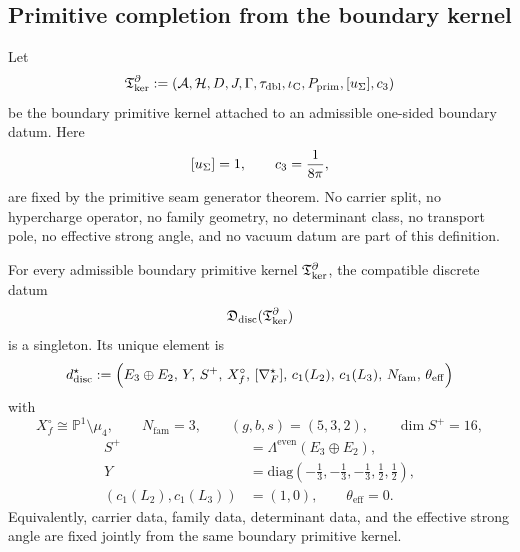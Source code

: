 \subsection{Primitive completion from the boundary kernel}

\begin{definition}
\label{def:boundary-primitive-kernel}
\label{def:post-carrier-primitive-kernel}
Let
\[
\mathfrak T_{\mathrm{ker}}^\partial
:=
(\mathcal A,\mathcal H,D,J,\Gamma,\tau_{\mathrm{dbl}},\iota_{\mathrm C},P_{\mathrm{prim}},[u_\Sigma],c_3)
\]
be the boundary primitive kernel attached to an admissible one-sided boundary datum. Here
\[
[u_\Sigma]=1,
\qquad
c_3=\frac{1}{8\pi},
\]
are fixed by the primitive seam generator theorem. No carrier split, no hypercharge operator, no
family geometry, no determinant class, no transport pole, no effective strong angle, and no
vacuum datum are part of this definition.
\end{definition}

\begin{theorem}
\label{thm:joint-discrete-admissible-sector}
\label{thm:discrete-sector-from-primitive-kernel}
For every admissible boundary primitive kernel $\mathfrak T_{\mathrm{ker}}^\partial$, the compatible discrete datum
\[
\mathfrak D_{\mathrm{disc}}(\mathfrak T_{\mathrm{ker}}^\partial)
\]
is a singleton. Its unique element is
\[
d^\star_{\mathrm{disc}}
:=
\Bigl(
E_3\oplus E_2,\,
Y,\,
S^+,\,
X_f^\circ,\,
[\nabla_F^\star],\,
c_1(L_2),\,
c_1(L_3),\,
N_{\mathrm{fam}},\,
\theta_{\mathrm{eff}}
\Bigr)
\]
with
\[
X_f^\circ\cong\mathbb P^1\setminus\mu_4,
\qquad
N_{\mathrm{fam}}=3,
\qquad
(g,b,s)=(5,3,2),
\qquad
\dim S^+=16,
\]
\[
\begin{aligned}
S^+&=\Lambda^{\mathrm{even}}(E_3\oplus E_2),\\
Y&=\mathrm{diag}\!\left(-\tfrac13,-\tfrac13,-\tfrac13,\tfrac12,\tfrac12\right),\\
(c_1(L_2),c_1(L_3))&=(1,0),\qquad
\theta_{\mathrm{eff}}=0.
\end{aligned}
\]
Equivalently, carrier data, family data, determinant data, and the effective strong angle are fixed
jointly from the same boundary primitive kernel.
\end{theorem}

